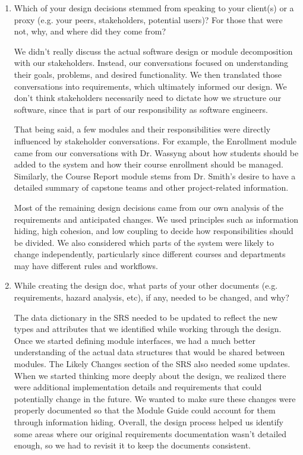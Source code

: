 \documentclass[12pt, titlepage]{article}
\begin{document}
\begin{enumerate}
  \item Which of your design decisions stemmed from speaking to your client(s)
  or a proxy (e.g. your peers, stakeholders, potential users)? For those that
  were not, why, and where did they come from?

  We didn't really discuss the actual software design or module decomposition with our stakeholders.
  Instead, our conversations focused on understanding their goals, problems, and desired functionality.
  We then translated those conversations into requirements, which ultimately informed our design.
  We don't think stakeholders necessarily need to dictate how we structure our software, since that is
  part of our responsibility as software engineers.

  That being said, a few modules and their responsibilities were directly influenced by
  stakeholder conversations. For example, the Enrollment module came from our conversations with Dr. Wassyng
  about how students should be added to the system and how their course enrollment should be managed.
  Similarly, the Course Report module stems from Dr. Smith's desire to have a detailed summary of capstone
  teams and other project-related information.

  Most of the remaining design decisions came from our own analysis of the requirements and anticipated changes.
  We used principles such as information hiding, high cohesion, and low coupling to decide how responsibilities
  should be divided. We also considered which parts of the system were likely to change independently,
  particularly since different courses and departments may have different rules and workflows.

  \item While creating the design doc, what parts of your other documents (e.g.
  requirements, hazard analysis, etc), if any, needed to be changed, and why?

  The data dictionary in the SRS needed to be updated to reflect the new types and attributes that we
  identified while working through the design. Once we started defining module interfaces, we had a much
  better understanding of the actual data structures that would be shared between modules.
  The Likely Changes section of the SRS also needed some updates.
  When we started thinking more deeply about the design, we realized there were additional
  implementation details and requirements that could potentially change in the future.
  We wanted to make sure these changes were properly documented so that the Module Guide could account for them through information hiding.
  Overall, the design process helped us identify some areas where our original requirements documentation wasn't
  detailed enough, so we had to revisit it to keep the documents consistent.


\end{enumerate}
\end{document}
